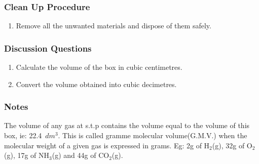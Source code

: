\subsubsection*{Clean Up Procedure}
\begin{enumerate}
\item{Remove all the unwanted materials and dispose of them safely.}
\end{enumerate}

\subsubsection*{Discussion Questions}
\begin{enumerate}
\item{Calculate the volume of the box in cubic centimetres.}
\item{Convert the volume obtained into cubic decimetres.}
\end{enumerate}

\subsubsection*{Notes}
The volume of any gas at s.t.p contains the volume equal to the volume of this box, ie: 22.4~$dm^{3}$. This is called gramme molecular volume(G.M.V.) when the molecular weight of a given gas is expressed in grams. Eg: 2g of H$_{2}$(g), 32g of O$_{2}$(g), 17g of NH$_{3}$(g) and 44g of CO$_{2}$(g).
